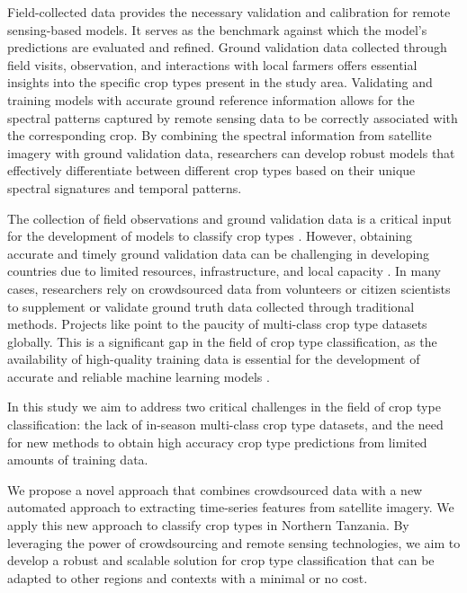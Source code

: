 \documentclass[
  journal,
  twocolumn]{IEEEtran}
\begin{document}
Field-collected data provides the necessary validation and calibration
for remote sensing-based models. It serves as the benchmark against
which the model's predictions are evaluated and refined. Ground
validation data collected through field visits, observation, and
interactions with local farmers offers essential insights into the
specific crop types present in the study area. Validating and training
models with accurate ground reference information allows for the
spectral patterns captured by remote sensing data to be correctly
associated with the corresponding crop. By combining the spectral
information from satellite imagery with ground validation data,
researchers can develop robust models that effectively differentiate
between different crop types based on their unique spectral signatures
and temporal patterns.

The collection of field observations and ground validation data is a
critical input for the development of models to classify crop types
\citep{delince2017handbook, MA2019166}. However, obtaining accurate and
timely ground validation data can be challenging in developing countries
due to limited resources, infrastructure, and local capacity
\citep{delince2017handbook, begue2018remote}. In many cases, researchers
rely on crowdsourced data from volunteers or citizen scientists to
supplement or validate ground truth data collected through traditional
methods. Projects like \citep{tseng2021cropharvest} point to the paucity
of multi-class crop type datasets globally. This is a significant gap in
the field of crop type classification, as the availability of
high-quality training data is essential for the development of accurate
and reliable machine learning models \citep{rs13132591}.

In this study we aim to address two critical challenges in the field of
crop type classification: the lack of in-season multi-class crop type
datasets, and the need for new methods to obtain high accuracy crop type
predictions from limited amounts of training data.

We propose a novel approach that combines crowdsourced data with a new
automated approach to extracting time-series features from satellite
imagery. We apply this new approach to classify crop types in Northern
Tanzania. By leveraging the power of crowdsourcing and remote sensing
technologies, we aim to develop a robust and scalable solution for crop
type classification that can be adapted to other regions and contexts
with a minimal or no cost.
\end{document}
